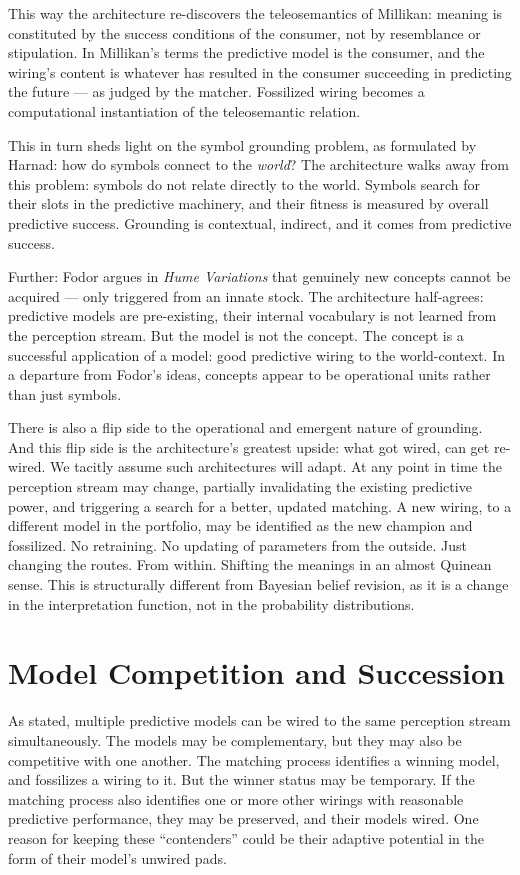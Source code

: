 \documentclass[12pt, a4paper]{article}
\begin{document}
This way the architecture re-discovers the teleosemantics of Millikan:
meaning is constituted by the success conditions of the consumer, not
by resemblance or stipulation. In Millikan's terms the predictive model
is the consumer, and the wiring's content is whatever has resulted in
the consumer succeeding in predicting the future --- as judged by the
matcher. Fossilized wiring becomes a computational instantiation of the
teleosemantic relation.

This in turn sheds light on the symbol grounding problem, as formulated
by Harnad: how do symbols connect to the \textit{world}? The
architecture walks away from this problem: symbols do not relate
directly to the world. Symbols search for their slots in the predictive
machinery, and their fitness is measured by overall predictive success.
Grounding is contextual, indirect, and it comes from predictive success.

Further: Fodor argues in \textit{Hume Variations} that genuinely new
concepts cannot be acquired --- only triggered from an innate stock. The
architecture half-agrees: predictive models are pre-existing, their
internal vocabulary is not learned from the perception stream. But the
model is not the concept. The concept is a successful application of a
model: good predictive wiring to the world-context. In a departure from
Fodor's ideas, concepts appear to be operational units rather than just
symbols.

There is also a flip side to the operational and emergent nature of
grounding. And this flip side is the architecture's greatest upside:
what got wired, can get re-wired. We tacitly assume such architectures
will adapt. At any point in time the perception stream may change,
partially invalidating the existing predictive power, and triggering a
search for a better, updated matching. A new wiring, to a different
model in the portfolio, may be identified as the new champion and
fossilized. No retraining. No updating of parameters from the outside.
Just changing the routes. From within. Shifting the meanings in an
almost Quinean sense. This is structurally different from Bayesian
belief revision, as it is a change in the interpretation function, not
in the probability distributions.

\section{Model Competition and Succession}

As stated, multiple predictive models can be wired to the same
perception stream simultaneously. The models may be complementary, but
they may also be competitive with one another. The matching process
identifies a winning model, and fossilizes a wiring to it. But the
winner status may be temporary. If the matching process also identifies
one or more other wirings with reasonable predictive performance, they
may be preserved, and their models wired. One reason for keeping these
``contenders'' could be their adaptive potential in the form of their
model's unwired pads.
\end{document}
